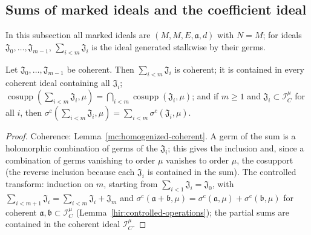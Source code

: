 \subsection{Sums of marked ideals and the coefficient ideal}

In this subsection all marked ideals are \((M,M,E,\mathfrak a,d)\) with \(N=M\); for ideals \(\mathfrak J_0,\dots,\mathfrak J_{m-1}\),
\(\sum_{i<m}\mathfrak J_i\) is the ideal generated stalkwise by their germs.


\begin{lemma}
\label{mc:finite-sum}
\leanok
Let \(\mathfrak J_0,\dots,\mathfrak J_{m-1}\) be coherent. Then \(\sum_{i<m}\mathfrak J_i\) is coherent; it is contained in every coherent ideal containing all
\(\mathfrak J_i\); \(\operatorname{cosupp}(\sum_{i<m}\mathfrak J_i,\mu)=\bigcap_{i<m}\operatorname{cosupp}(\mathfrak J_i,\mu)\); and if \(m\ge1\) and
\(\mathfrak J_i\subset\mathcal I_C^\mu\) for all \(i\), then \(\sigma^{\mathrm c}(\sum_{i<m}\mathfrak J_i,\mu)=\sum_{i<m}\sigma^{\mathrm c}(\mathfrak J_i,\mu)\).
\end{lemma}
\begin{proof}
\leanok
Coherence: Lemma~\ref{mc:homogenized-coherent}. A germ of the sum is a holomorphic combination of germs of the \(\mathfrak J_i\); this gives the
inclusion and, since a combination of germs vanishing to order \(\mu\) vanishes to order \(\mu\), the cosupport (the reverse inclusion because each
\(\mathfrak J_i\) is contained in the sum). The controlled transform: induction on \(m\), starting from \(\sum_{i<1}\mathfrak J_i=\mathfrak J_0\), with
\(\sum_{i<m+1}\mathfrak J_i=\sum_{i<m}\mathfrak J_i+\mathfrak J_m\) and \(\sigma^{\mathrm c}(\mathfrak a+\mathfrak b,\mu)=\sigma^{\mathrm c}(\mathfrak a,\mu)+\sigma^{\mathrm c}(\mathfrak b,\mu)\)
for coherent \(\mathfrak a,\mathfrak b\subset\mathcal I_C^\mu\) (Lemma~\ref{hir:controlled-operations}); the partial sums are contained in the coherent ideal \(\mathcal I_C^\mu\).
\end{proof}

